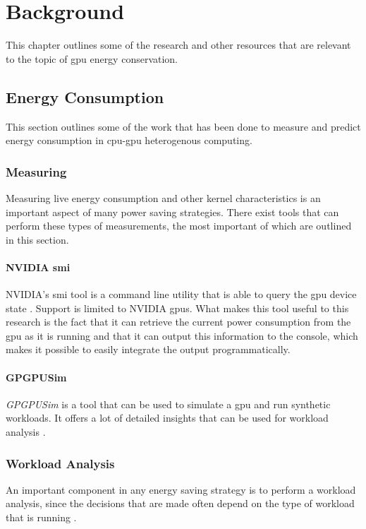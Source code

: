 \chapter{Background}
	This chapter outlines some of the research and other resources that are relevant to the topic of \gls{gpu} energy conservation.

	\section{Energy Consumption}
		This section outlines some of the work that has been done to measure and predict energy consumption in \gls{cpu}-\gls{gpu} heterogenous computing.

		\subsection{Measuring}
			Measuring live energy consumption and other kernel characteristics is an important aspect of many power saving strategies.
			There exist tools that can perform these types of measurements, the most important of which are outlined in this section.

			\subsubsection{NVIDIA \acrlong{smi}}
				NVIDIA's \gls{smi} tool is a command line utility that is able to query the \gls{gpu} device state \parencite{NVIDIA}.
				Support is limited to NVIDIA \glspl{gpu}.
				What makes this tool useful to this research is the fact that it can retrieve the current power consumption from the \gls{gpu} as it is running and that it can output this information to the console, which makes it possible to easily integrate the output programmatically.

			\subsubsection{GPGPUSim}
				\emph{GPGPUSim} is a tool that can be used to simulate a \gls{gpu} and run synthetic workloads.
				It offers a lot of detailed insights that can be used for workload analysis \parencite{Bakhoda2009}.

		\subsection{Workload Analysis}
			An important component in any energy saving strategy is to perform a workload analysis, since the decisions that are made often depend on the type of workload that is running \parencite{Chen2011}.

